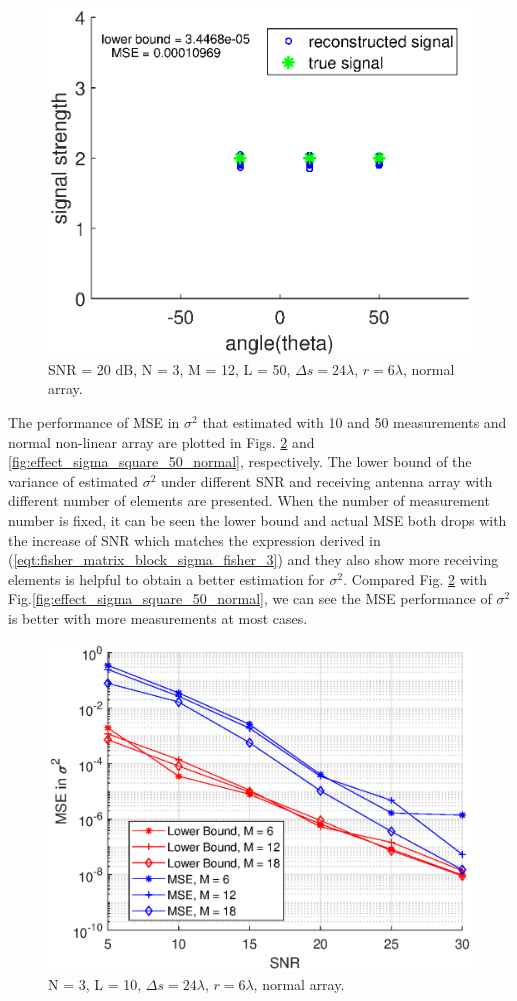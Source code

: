 \documentclass[proposal]{umthesis}          %
\begin{document}
\begin{figure}[H]
	\centering
	\includegraphics[width=0.6\columnwidth]{./results/snapshot_effect_50_normal}
	\caption{SNR = 20 dB, N = 3, M = 12, L = 50, $\Delta s = 24 \lambda$, $r = 6\lambda$, normal array.}
	\label{fig:snapshot_effect_50_normal}
\end{figure}

The performance of MSE in $\sigma^{2}$ that estimated with 10 and 50 measurements and normal non-linear array are plotted in Figs. \ref{fig:effect_sigma_square_10_normal} and \ref{fig:effect_sigma_square_50_normal}, respectively. 
The lower bound of the variance of estimated $\sigma^{2}$ under different SNR and receiving antenna array with different number of elements are presented. 
When the number of measurement number is fixed, it can be seen the lower bound and actual MSE both drops with the increase of SNR which matches the expression derived in (\ref{eqt:fisher_matrix_block_sigma_fisher_3}) and they also show more receiving elements is helpful to obtain a better estimation for $\sigma^{2}$.
Compared Fig. \ref{fig:effect_sigma_square_10_normal} with Fig.\ref{fig:effect_sigma_square_50_normal}, we can see the MSE performance of $\sigma^{2}$ is better with more measurements at most cases.    

\begin{figure}[H]
	\centering
	\includegraphics[width=0.6\columnwidth]{./results/change_of_sigma_square_L_10}
	\caption{N = 3, L = 10, $\Delta s = 24 \lambda$, $r = 6\lambda$, normal array.}
	\label{fig:effect_sigma_square_10_normal}
\end{figure}
\end{document}
